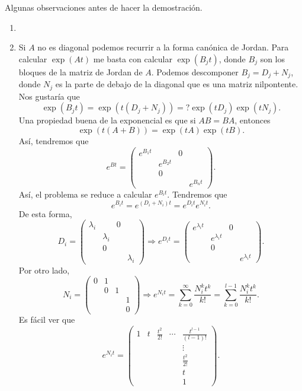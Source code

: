 \begin{observation}
Algunas observaciones antes de hacer la demostración.
\begin{enumerate}
\item \item Si $\displaystyle A $ no es diagonal podemos recurrir a la forma canónica de Jordan. Para calcular $\displaystyle \exp\left(At\right) $ me basta con calcular $\displaystyle \exp\left(B_{j}t\right) $, donde $\displaystyle B_{j} $ son los bloques de la matriz de Jordan de $\displaystyle A $. Podemos descomponer $\displaystyle B_{j}=D_{j}+N_{j} $, donde $\displaystyle N_{j} $ es la parte de debajo de la diagonal que es una matriz nilpontente. Nos gustaría que 
	\[\exp\left(B_{j}t\right)=\exp\left(t\left(D_{j}+N_{j}\right)\right)=?\exp\left(tD_{j}\right)\exp\left(tN_{j}\right) .\]
Una propiedad buena de la exponencial es que si $\displaystyle AB = BA $, entonces
\[\exp\left(t\left(A + B\right)\right)=\exp\left(tA\right)\exp\left(tB\right) .\]
Así, tendremos que 
\[e^{Bt}=\begin{pmatrix} e^{B_{1}t} & &0 & \\
	& e^{B_{2}t} & & \\
	& 0& & \\
	& & & e^{B_{n}t}\end{pmatrix} .\]
Así, el problema se reduce a calcular $\displaystyle e^{B_{i}t} $. Tendremos que 
\[e^{B_{i}t}=e^{\left(D_{i}+N_{i}\right)t}=e^{D_{i}t}e^{N_{i}t} .\]
De esta forma,
\[D_{i}=\begin{pmatrix} \lambda_{i} & &0 & \\
	& \lambda_{i} & & \\
	& 0& & \\
	& & & \lambda_{i}\end{pmatrix} \Rightarrow e^{D_{i}t} = \begin{pmatrix} e^{\lambda_{i}t} & &0 & \\
	& e^{\lambda_{i}t} & & \\
	& 0& & \\
	& & & e^{\lambda_{i}t}\end{pmatrix}.\]
Por otro lado, 
\[N_{i}=\begin{pmatrix} 0 & 1& & \\
	& 0 & 1& \\
	& & & 1\\
	& & & 0  \end{pmatrix} \Rightarrow e^{N_{i}t}=\sum^{\infty}_{k = 0}\frac{N_{i}^{k}t^{k}}{k !}= \sum^{l-1}_{k = 0}\frac{N_{i}^{k}t ^{k}}{k!}.\]
Es fácil ver que
	\[e^{N_{i}t}=\begin{pmatrix} 1 & t & \frac{t ^{2}}{2!} & \cdots & \frac{t ^{l-1}}{\left(l-1\right)!} \\
	& & & & \vdots \\
	& & & & \frac{t ^{2}}{2!} \\
	& & & & t \\
	& & & & 1\end{pmatrix} .\]


\end{enumerate}
\end{observation}
